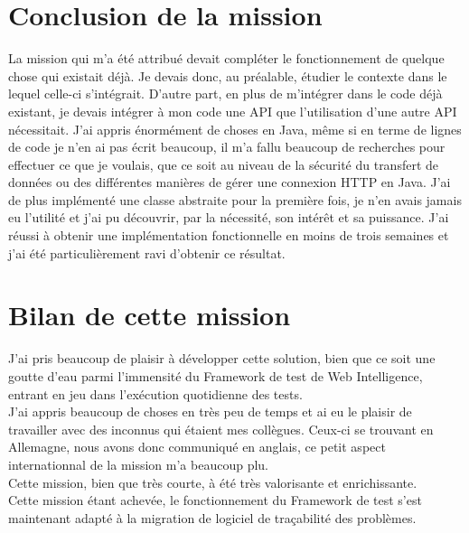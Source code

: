 \section{Conclusion de la mission}
La mission qui m'a été attribué devait compléter le fonctionnement de quelque chose qui existait déjà. Je devais donc, au préalable, étudier le contexte dans le lequel celle-ci s'intégrait. D'autre part, en plus de m'intégrer dans le code déjà existant, je devais intégrer à mon code une API que l'utilisation d'une autre API nécessitait. J'ai appris énormément de choses en Java, même si en terme de lignes de code je n'en ai pas écrit beaucoup, il m'a fallu beaucoup de recherches pour effectuer ce que je voulais, que ce soit au niveau de la sécurité du transfert de données ou des différentes manières de gérer une connexion HTTP en Java. J'ai de plus implémenté une classe abstraite pour la première fois, je n'en avais jamais eu l'utilité et j'ai pu découvrir, par la nécessité, son intérêt et sa puissance. J'ai réussi à obtenir une implémentation fonctionnelle en moins de trois semaines et j'ai été particulièrement ravi d'obtenir ce résultat.



\section{Bilan de cette mission}

J'ai pris beaucoup de plaisir à développer cette solution, bien que ce soit une goutte d'eau parmi l'immensité du Framework de test de Web Intelligence, entrant en jeu dans l'exécution quotidienne des tests.\\
J'ai appris beaucoup de choses en très peu de temps et ai eu le plaisir de travailler avec des inconnus qui étaient mes collègues. Ceux-ci se trouvant en Allemagne, nous avons donc communiqué en anglais, ce petit aspect internationnal de la mission m'a beaucoup plu.\\
Cette mission, bien que très courte, à été très valorisante et enrichissante.\\

Cette mission étant achevée, le fonctionnement du Framework de test s'est maintenant adapté à la migration de logiciel de traçabilité des problèmes.


